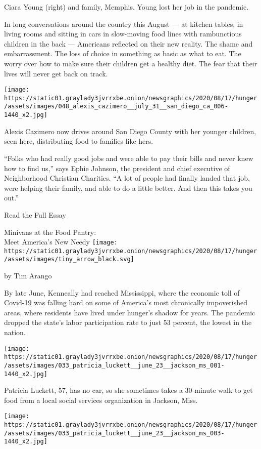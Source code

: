 Ciara Young (right) and family, Memphis. Young lost her job in the
pandemic.

In long conversations around the country this August --- at kitchen
tables, in living rooms and sitting in cars in slow-moving food lines
with rambunctious children in the back --- Americans reflected on their
new reality. The shame and embarrassment. The loss of choice in
something as basic as what to eat. The worry over how to make sure their
children get a healthy diet. The fear that their lives will never get
back on track.

\texttt{[image: https://static01.graylady3jvrrxbe.onion/newsgraphics/2020/08/17/hunger/assets/images/048\_alexis\_cazimero\_\_july\_31\_\_san\_diego\_ca\_006-1440\_x2.jpg]}

Alexis Cazimero now drives around San Diego County with her younger
children, seen here, distributing food to families like hers.

``Folks who had really good jobs and were able to pay their bills and
never knew how to find us,'' says Ephie Johnson, the president and chief
executive of Neighborhood Christian Charities. ``A lot of people had
finally landed that job, were helping their family, and able to do a
little better. And then this takes you out.''

Read the Full Essay

\href{https://www.nytimes3xbfgragh.onion/2020/09/03/us/food-pantries-hunger-us.html}{}

Minivans at the Food Pantry:\\
Meet America's New Needy
\texttt{[image: https://static01.graylady3jvrrxbe.onion/newsgraphics/2020/08/17/hunger/assets/images/tiny\_arrow\_black.svg]}

by Tim Arango

By late June, Kenneally had reached Mississippi, where the economic toll
of Covid-19 was falling hard on some of America's most chronically
impoverished areas, where residents have lived under hunger's shadow for
years. The pandemic dropped the state's labor participation rate to just
53 percent, the lowest in the nation.

\texttt{[image: https://static01.graylady3jvrrxbe.onion/newsgraphics/2020/08/17/hunger/assets/images/033\_patricia\_luckett\_\_june\_23\_\_jackson\_ms\_001-1440\_x2.jpg]}

Patricia Luckett, 57, has no car, so she sometimes takes a 30-minute
walk to get food from a local social services organization in Jackson,
Miss.

\texttt{[image: https://static01.graylady3jvrrxbe.onion/newsgraphics/2020/08/17/hunger/assets/images/033\_patricia\_luckett\_\_june\_23\_\_jackson\_ms\_003-1440\_x2.jpg]}

